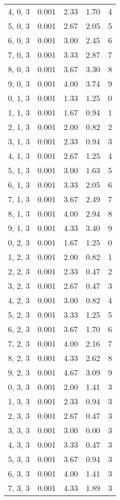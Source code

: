 \documentclass[12pt]{article}
\begin{document}
\begin{tabular}{c || c || c | c | c}
4, 0, 3 & 0.001 & 2.33 & 1.70 & 4 \\
5, 0, 3 & 0.001 & 2.67 & 2.05 & 5 \\
6, 0, 3 & 0.001 & 3.00 & 2.45 & 6 \\
7, 0, 3 & 0.001 & 3.33 & 2.87 & 7 \\
8, 0, 3 & 0.001 & 3.67 & 3.30 & 8 \\
9, 0, 3 & 0.001 & 4.00 & 3.74 & 9 \\
0, 1, 3 & 0.001 & 1.33 & 1.25 & 0 \\
1, 1, 3 & 0.001 & 1.67 & 0.94 & 1 \\
2, 1, 3 & 0.001 & 2.00 & 0.82 & 2 \\
3, 1, 3 & 0.001 & 2.33 & 0.94 & 3 \\
4, 1, 3 & 0.001 & 2.67 & 1.25 & 4 \\
5, 1, 3 & 0.001 & 3.00 & 1.63 & 5 \\
6, 1, 3 & 0.001 & 3.33 & 2.05 & 6 \\
7, 1, 3 & 0.001 & 3.67 & 2.49 & 7 \\
8, 1, 3 & 0.001 & 4.00 & 2.94 & 8 \\
9, 1, 3 & 0.001 & 4.33 & 3.40 & 9 \\
0, 2, 3 & 0.001 & 1.67 & 1.25 & 0 \\
1, 2, 3 & 0.001 & 2.00 & 0.82 & 1 \\
2, 2, 3 & 0.001 & 2.33 & 0.47 & 2 \\
3, 2, 3 & 0.001 & 2.67 & 0.47 & 3 \\
4, 2, 3 & 0.001 & 3.00 & 0.82 & 4 \\
5, 2, 3 & 0.001 & 3.33 & 1.25 & 5 \\
6, 2, 3 & 0.001 & 3.67 & 1.70 & 6 \\
7, 2, 3 & 0.001 & 4.00 & 2.16 & 7 \\
8, 2, 3 & 0.001 & 4.33 & 2.62 & 8 \\
9, 2, 3 & 0.001 & 4.67 & 3.09 & 9 \\
0, 3, 3 & 0.001 & 2.00 & 1.41 & 3 \\
1, 3, 3 & 0.001 & 2.33 & 0.94 & 3 \\
2, 3, 3 & 0.001 & 2.67 & 0.47 & 3 \\
3, 3, 3 & 0.001 & 3.00 & 0.00 & 3 \\
4, 3, 3 & 0.001 & 3.33 & 0.47 & 3 \\
5, 3, 3 & 0.001 & 3.67 & 0.94 & 3 \\
6, 3, 3 & 0.001 & 4.00 & 1.41 & 3 \\
7, 3, 3 & 0.001 & 4.33 & 1.89 & 3 \\

\end{tabular}
\end{document}
